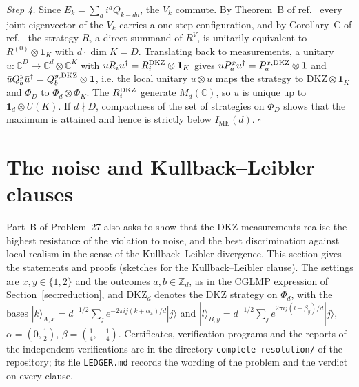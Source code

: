 \documentclass[11pt]{amsart}
\theoremstyle{definition}
\theoremstyle{remark}
\numberwithin{equation}{section}
\newcommand{\C}{\mathbb{C}}
\newcommand{\Z}{\mathbb{Z}}
\newcommand{\one}{\mathbf{1}}
\newcommand{\IME}{I_{\mathrm{ME}}}
\newcommand{\DKZ}{\mathrm{DKZ}}
\begin{document}
\emph{Step 4.} Since $E_k=\sum_ai^aQ_{k-da}$, the $V_k$ commute. By Theorem~B of ref.~\cite{classical} every joint
eigenvector of the $V_k$ carries a one-step configuration, and by Corollary~C of ref.~\cite{classical} the strategy
$R$, a direct summand of $R^V$, is unitarily equivalent to $R^{(0)}\otimes\one_K$ with $d\cdot\dim K=D$. Translating back
to measurements, a unitary $u:\C^D\to\C^d\otimes\C^K$ with $uR_iu^\dagger=R^{\rm DKZ}_i\otimes\one_K$ gives
$uP^x_au^\dagger=P^{x,\rm DKZ}_a\otimes\one$ and $\bar uQ^y_b\bar u^\dagger=Q^{y,\rm DKZ}_b\otimes\one$, i.e. the local
unitary $u\otimes\bar u$ maps the strategy to $\mathrm{DKZ}\otimes\one_K$ and $\Phi_D$ to $\Phi_d\otimes\Phi_K$. The
$R^{\rm DKZ}_i$ generate $M_d(\C)$, so $u$ is unique up to $\one_d\otimes U(K)$. If $d\nmid D$, compactness of the set
of strategies on $\Phi_D$ shows that the maximum is attained and hence is strictly below $\IME(d)$.
\hfill$\square$

\section{The noise and Kullback--Leibler clauses}\label{sec:clauses}

Part~B of Problem~27 also asks to show that the DKZ measurements realise the highest resistance of the violation to
noise, and the best discrimination against local realism in the sense of the Kullback--Leibler divergence\cite{vDGG}.
This section gives the statements and proofs (sketches for the Kullback--Leibler clause). The settings are
$x,y\in\{1,2\}$ and the outcomes $a,b\in\Z_d$, as in the CGLMP expression of Section~\ref{sec:reduction}, and $\DKZ_d$
denotes the DKZ strategy on $\Phi_d$, with the bases $|k\rangle_{A,x}=d^{-1/2}\sum_je^{-2\pi ij(k+\alpha_x)/d}|j\rangle$
and $|l\rangle_{B,y}=d^{-1/2}\sum_je^{2\pi ij(l-\beta_y)/d}|j\rangle$, $\alpha=(0,\frac12)$, $\beta=(\frac14,-\frac14)$.
Certificates, verification programs and the reports of the independent verifications are in the directory
\texttt{complete-resolution/} of the repository\cite{repoOQP}; its file \texttt{LEDGER.md} records the wording of the
problem\cite{OQP} and the verdict on every clause.
\end{document}
